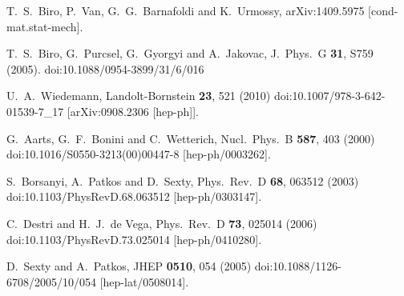 \documentclass[aps,prd,twocolumn,showpacs,superscriptaddress,groupedaddress]{revtex4}  %
\begin{document}
\begin{thebibliography}{99}
  T.~S.~Biro, P.~Van, G.~G.~Barnafoldi and K.~Urmossy,
  arXiv:1409.5975 [cond-mat.stat-mech].

  T.~S.~Biro, G.~Purcsel, G.~Gyorgyi and A.~Jakovac,
  J.\ Phys.\ G {\bf 31}, S759 (2005).
  doi:10.1088/0954-3899/31/6/016

  U.~A.~Wiedemann,
  Landolt-Bornstein {\bf 23}, 521 (2010)
  doi:10.1007/978-3-642-01539-7\_17
  [arXiv:0908.2306 [hep-ph]].

  G.~Aarts, G.~F.~Bonini and C.~Wetterich,
  Nucl.\ Phys.\ B {\bf 587}, 403 (2000)
  doi:10.1016/S0550-3213(00)00447-8
  [hep-ph/0003262].

  S.~Borsanyi, A.~Patkos and D.~Sexty,
  Phys.\ Rev.\ D {\bf 68}, 063512 (2003)
  doi:10.1103/PhysRevD.68.063512
  [hep-ph/0303147].

  C.~Destri and H.~J.~de Vega,
  Phys.\ Rev.\ D {\bf 73}, 025014 (2006)
  doi:10.1103/PhysRevD.73.025014
  [hep-ph/0410280].

  D.~Sexty and A.~Patkos,
  JHEP {\bf 0510}, 054 (2005)
  doi:10.1088/1126-6708/2005/10/054
  [hep-lat/0508014].



\end{thebibliography}
\end{document}
